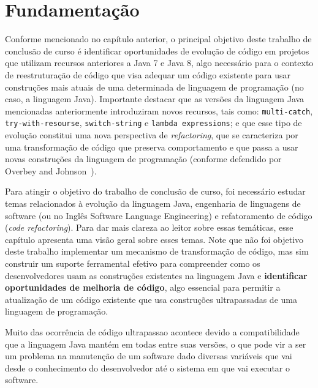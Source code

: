 %
%
\chapter{Fundamentaç\~{a}o}

Conforme mencionado no cap\'{i}tulo anterior, o principal objetivo deste trabalho de conclus\~{a}o de curso \'{e} 
identificar oportunidades de evoluç\~{a}o de c\'{o}digo em projetos que utilizam recursos anteriores a Java 7 e Java 8, 
algo necess\'{a}rio para o contexto de reestrutura\c c\~{a}o de c\'{o}digo que visa adequar um c\'{o}digo 
existente para usar constru\c c\~{o}es mais atuais de uma determinada de linguagem de programa\c c\~{a}o 
(no caso, a linguagem Java). Importante destacar que as vers\~{o}es da linguagem Java mencionadas anteriormente
introduziram novos recursos, tais como: \texttt{multi-catch}, \texttt{try-with-resourse}, \texttt{switch-string} 
e \texttt{lambda expressions}; e que esse tipo de evoluç\~{a}o constitui uma nova perspectiva de \textit{refactoring}, que se caracteriza 
por uma transforma\c c\~{a}o de c\'{o}digo que preserva comportamento e que passa a usar  
novas constru\c c\~{o}es da linguagem de programa\c c\~{a}o (conforme defendido por Overbey and Johnson~\cite{Overbey:2009}). 

Para atingir o objetivo do trabalho de conclus\~{a}o de curso, foi necess\'{a}rio estudar temas relacionados 
\`{a} evolu\c c\~{a}o da linguagem Java, engenharia de linguagens de software (ou no Ingl\^{e}s Software 
Language Engineering) e refatoramento de c\'{o}digo (\emph{code refactoring}).  Para dar mais clareza ao leitor 
sobre essas tem\'{a}ticas, esse cap\'{i}tulo apresenta uma vis\~{a}o geral sobre esses temas. Note que n\~{a}o foi objetivo
deste trabalho implementar um mecanismo de transforma\c c\~{a}o de c\'{o}digo, mas sim construir um suporte ferramental 
efetivo para compreender como os desenvolvedores usam as constru\c c\~{o}es existentes na linguagem Java e {\bf identificar oportunidades de melhoria de c\'{o}digo}, algo essencial para permitir a atualiza\c c\~{a}o de um c\'{o}digo existente que usa constru\c c\~{o}es ultrapassadas de uma linguagem de programa\c c\~{a}o. 
 
Muito das ocorr\^{e}ncia de c\'{o}digo ultrapassao acontece devido a compatibilidade que a linguagem Java mant\'{e}m em todas entre suas vers\~{o}es, o que pode vir a ser um problema na manuten\c{c}\~{a}o de um software dado diversas vari\'{a}veis que vai desde o conhecimento do desenvolvedor at\'{e} o sistema em que vai executar o software.
 
